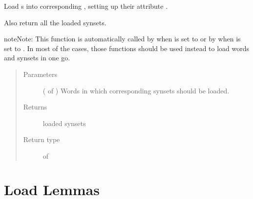 \documentclass[letterpaper,10pt,english]{sphinxmanual}
\begin{document}

\begin{fulllineitems}
\label{\detokenize{load:loacore.load.synset_load.load_synsets_in_words}}
Load {\hyperref[\detokenize{classes:loacore.classes.classes.Synset}]{}} s into corresponding , setting up their attribute .

Also return all the loaded synsets.

\begin{sphinxadmonition}{note}{Note:}
This function is automatically called by  when  is set to
 or by  when  is set to .
In most of the cases, those functions should be used instead to load words and synsets in one go.
\end{sphinxadmonition}
\begin{quote}\begin{description}
\item[{Parameters}] \leavevmode
{} ( of {\hyperref[\detokenize{classes:loacore.classes.classes.Word}]{}}) \textendash{} Words in which corresponding synsets should be loaded.

\item[{Returns}] \leavevmode
loaded synsets

\item[{Return type}] \leavevmode
{} of {\hyperref[\detokenize{classes:loacore.classes.classes.Synset}]{}}

\end{description}\end{quote}

\end{fulllineitems}



\section{Load Lemmas}
\label{\detokenize{load:module-loacore.load.lemma_load}}\label{\detokenize{load:load-lemmas}}
\end{document}
